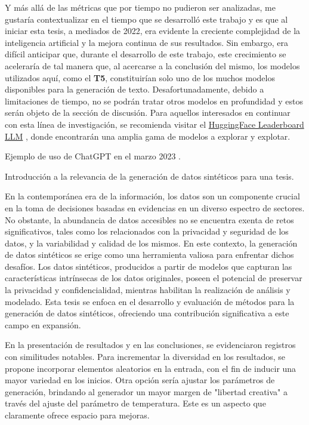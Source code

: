 Y más allá de las métricas que por tiempo no pudieron ser analizadas, me gustaría contextualizar en el tiempo que se desarrolló este trabajo y es que al iniciar esta tesis, a mediados de 2022, era evidente la creciente complejidad de la inteligencia artificial y la mejora continua de sus resultados. Sin embargo, era difícil anticipar que, durante el desarrollo de este trabajo, este crecimiento se aceleraría de tal manera que, al acercarse a la conclusión del mismo, los modelos utilizados aquí, como el \textbf{T5}, constituirían solo uno de los muchos modelos disponibles para la generación de texto. Desafortunadamente, debido a limitaciones de tiempo, no se podrán tratar otros modelos en profundidad y estos serán objeto de la sección de discusión. Para aquellos interesados en continuar con esta línea de investigación, se recomienda visitar el \href{https://huggingface.co/spaces/HuggingFaceH4/open_llm_leaderboard}{HuggingFace Leaderboard LLM} \cite{noauthor_open_nodate}, donde encontrarán una amplia gama de modelos a explorar y explotar.

Ejemplo de uso de ChatGPT en el marzo 2023 \cite{openai_chatgpt_2023}.
\begin{prompt}
    Introducción a la relevancia de la generación de datos sintéticos para una tesis.
\end{prompt}

\begin{chatGPT}
En la contemporánea era de la información, los datos son un componente crucial en la toma de decisiones basadas en evidencias en un diverso espectro de sectores. No obstante, la abundancia de datos accesibles no se encuentra exenta de retos significativos, tales como los relacionados con la privacidad y seguridad de los datos, y la variabilidad y calidad de los mismos. En este contexto, la generación de datos sintéticos se erige como una herramienta valiosa para enfrentar dichos desafíos. Los datos sintéticos, producidos a partir de modelos que capturan las características intrínsecas de los datos originales, poseen el potencial de preservar la privacidad y confidencialidad, mientras habilitan la realización de análisis y modelado. Esta tesis se enfoca en el desarrollo y evaluación de métodos para la generación de datos sintéticos, ofreciendo una contribución significativa a este campo en expansión.
\end{chatGPT}

En la presentación de resultados y en las conclusiones, se evidenciaron registros con similitudes notables. Para incrementar la diversidad en los resultados, se propone incorporar elementos aleatorios en la entrada, con el fin de inducir una mayor variedad en los inicios. Otra opción sería ajustar los parámetros de generación, brindando al generador un mayor margen de "libertad creativa" a través del ajuste del parámetro de temperatura. Este es un aspecto que claramente ofrece espacio para mejoras.

